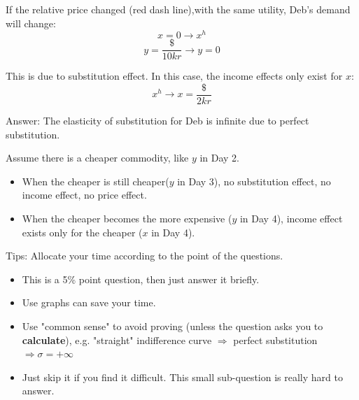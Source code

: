 \documentclass{article}
\begin{document}
\begin{mdframed}[backgroundcolor=blue!20,linecolor=white]
\begin{center}
\label{fig:fair}
\end{center}

\vspace{2mm}


If the relative price changed (red dash line),with the same utility, Deb's demand will change:
$$x=0 \to x^h$$
$$y=\frac{\$}{10 kr} \to y= 0$$

This is due to substitution effect. In this case, the income effects only exist for $x$:
$$x^h \to x= \frac{\$}{2kr}$$

\end{mdframed}

Answer: The elasticity of substitution for Deb is infinite due to perfect substitution.

Assume there is a cheaper commodity, like $y$ in Day 2.
\begin{itemize}
\item When the cheaper is still cheaper($y$ in Day 3), no substitution effect, no income effect, no price effect.
\item When the cheaper becomes the more expensive ($y$ in Day 4),  income effect exists only for the cheaper ($x$ in Day 4).
\end{itemize}

\begin{mdframed}[backgroundcolor=yellow!20,linecolor=white]
Tips: Allocate your time according to the point of the questions.
\begin{itemize}
\item This is a 5\% point question, then just answer it briefly. 
\item Use graphs can save your time.
\item Use "common sense" to avoid proving (unless the question asks you to \textbf{calculate}), e.g. "straight" indifference curve  $\Rightarrow$ perfect substitution $\Rightarrow \sigma = + \infty $ 
\item Just skip it if you find it difficult. This small sub-question is really hard to answer.
\end{itemize}



\end{mdframed}
\end{document}
